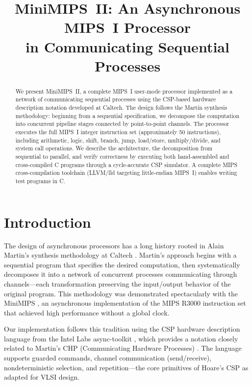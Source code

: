 \documentclass[11pt]{article}
\title{MiniMIPS~II: An Asynchronous MIPS~I Processor\\
in Communicating Sequential Processes}
\author{}
\date{}
\begin{document}
\maketitle

\begin{abstract}
We present MiniMIPS~II, a complete MIPS~I user-mode processor implemented as a
network of communicating sequential processes using the CSP-based hardware
description notation developed at Caltech.  The design follows the Martin
synthesis methodology: beginning from a sequential specification, we decompose
the computation into concurrent pipeline stages connected by point-to-point
channels.  The processor executes the full MIPS~I integer instruction set
(approximately 50 instructions), including arithmetic, logic, shift, branch,
jump, load/store, multiply/divide, and system call operations.  We describe
the architecture, the decomposition from sequential to parallel, and verify
correctness by executing both hand-assembled and cross-compiled C programs
through a cycle-accurate CSP simulator.  A complete MIPS cross-compilation
toolchain (LLVM/lld targeting little-endian MIPS~I) enables writing test
programs in C.
\end{abstract}

\section{Introduction}

The design of asynchronous processors has a long history rooted in
Alain Martin's synthesis methodology at Caltech
\cite{Martin1990,Martin2006,MartinSynthesis}.  Martin's approach begins with
a sequential program that specifies the desired computation, then systematically
decomposes it into a network of concurrent processes communicating through
channels---each transformation preserving the input/output behavior of the
original program.  This methodology was demonstrated spectacularly with the
MiniMIPS \cite{MiniMIPS2002,Lines1998}, an asynchronous implementation of the
MIPS R3000 instruction set that achieved high performance without a global
clock.

Our implementation follows this tradition using the CSP hardware description
language from the Intel Labs async-toolkit \cite{AsyncToolkit}, which provides
a notation closely related to Martin's CHP (Communicating Hardware Processes)
\cite{Martin1990}.  The language supports guarded commands, channel
communication (send/receive), nondeterministic selection, and repetition---the
core primitives of Hoare's CSP \cite{Hoare1978,Hoare1985} as adapted for
VLSI design.
\end{document}
